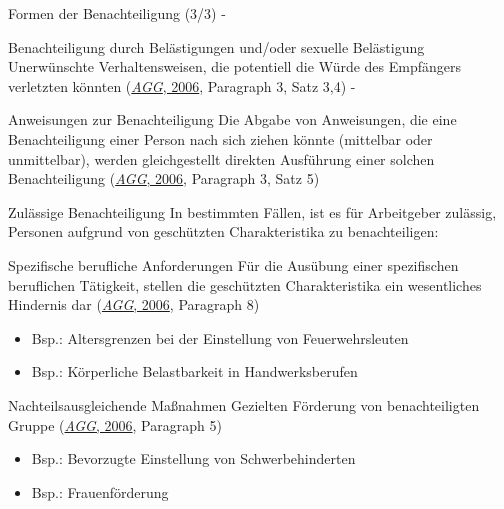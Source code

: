 \documentclass[
  10pt,
  ngerman,
  ignorenonframetext,
]{beamer}
\providecommand{\tightlist}{%
  \setlength{\itemsep}{0pt}\setlength{\parskip}{0pt}}
\begin{document}
\begin{frame}{Formen der Benachteiligung (3/3) -}
\protect\hypertarget{formen-der-benachteiligung-33--}{}
\begin{block}{Benachteiligung durch Belästigungen und/oder sexuelle
Belästigung}
\protect\hypertarget{benachteiligung-durch-beluxe4stigungen-undoder-sexuelle-beluxe4stigung}{}
Unerwünschte Verhaltensweisen, die potentiell die Würde des Empfängers
verletzten könnten (\protect\hyperlink{ref-agg}{\emph{AGG}, 2006},
Paragraph 3, Satz 3,4) -
\end{block}

\begin{block}{Anweisungen zur Benachteiligung}
\protect\hypertarget{anweisungen-zur-benachteiligung}{}
Die Abgabe von Anweisungen, die eine Benachteiligung einer Person nach
sich ziehen könnte (mittelbar oder unmittelbar), werden gleichgestellt
direkten Ausführung einer solchen Benachteiligung
(\protect\hyperlink{ref-agg}{\emph{AGG}, 2006}, Paragraph 3, Satz 5)
\end{block}
\end{frame}

\begin{frame}{Zulässige Benachteiligung}
\protect\hypertarget{zuluxe4ssige-benachteiligung}{}
In bestimmten Fällen, ist es für Arbeitgeber zulässig, Personen aufgrund
von geschützten Charakteristika zu benachteiligen:

\begin{block}{Spezifische berufliche Anforderungen}
\protect\hypertarget{spezifische-berufliche-anforderungen}{}
Für die Ausübung einer spezifischen beruflichen Tätigkeit, stellen die
geschützten Charakteristika ein wesentliches Hindernis dar
(\protect\hyperlink{ref-agg}{\emph{AGG}, 2006}, Paragraph 8)

\begin{itemize}
\tightlist
\item
  Bsp.: Altersgrenzen bei der Einstellung von Feuerwehrsleuten
\item
  Bsp.: Körperliche Belastbarkeit in Handwerksberufen
\end{itemize}
\end{block}

\begin{block}{Nachteilsausgleichende Maßnahmen}
\protect\hypertarget{nachteilsausgleichende-mauxdfnahmen}{}
Gezielten Förderung von benachteiligten Gruppe
(\protect\hyperlink{ref-agg}{\emph{AGG}, 2006}, Paragraph 5)

\begin{itemize}
\tightlist
\item
  Bsp.: Bevorzugte Einstellung von Schwerbehinderten
\item
  Bsp.: Frauenförderung
\end{itemize}
\end{block}
\end{frame}
\end{document}
